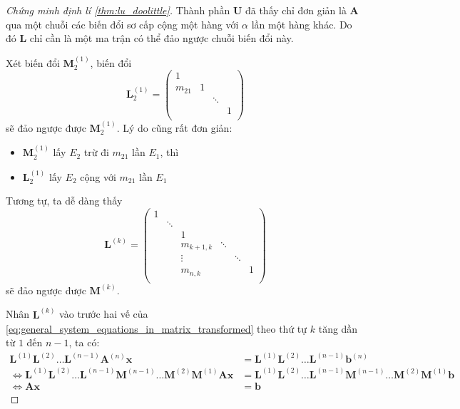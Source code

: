 \documentclass[../../Lectures]{subfiles}
\begin{document}
\begin{proof}[Chứng minh định lí \ref{thm:lu_doolittle}]
    Thành phần \(\bm{U}\) đã thấy chỉ đơn giản là \(\bm{A}\) qua một chuỗi các
    biến đổi sơ cấp cộng một hàng với \(\alpha\) lần một hàng khác. Do đó
    \(\bm{L}\) chỉ cần là một ma trận có thể đảo ngược chuỗi biến đổi này.

    Xét biến đổi \(\bm{M}_2^{(1)}\), biến đổi
    \[
        \bm{L}_2^{(1)} =
            \begin{pmatrix}
                    1   &     &          &     \\
                m_{21}  &  1  &          &     \\
                        &     &  \ddots  &     \\
                        &     &          &  1  \\
            \end{pmatrix}
    \]
    sẽ đảo ngược được \(\bm{M}_2^{(1)}\). Lý do cũng rất đơn giản:
    \begin{itemize}
        \item \(\bm{M}_2^{(1)}\) lấy \(E_2\) trừ đi \(m_{21}\) lần \(E_1\), thì
        \item \(\bm{L}_2^{(1)}\) lấy \(E_2\) cộng với \(m_{21}\) lần \(E_1\)
    \end{itemize}

    Tương tự, ta dễ dàng thấy
    \[
        \bm{L}^{(k)} =
            \begin{pmatrix}
                1  &          &                &          &          &     \\
                   &  \ddots  &                &          &          &     \\
                   &          &        1       &          &          &     \\
                   &          &  m_{k + 1, k}  &  \ddots  &          &     \\
                   &          &     \vdots     &          &  \ddots  &     \\
                   &          &  m_{n, k}      &          &          &  1  \\
            \end{pmatrix}
    \]
    sẽ đảo ngược được \(\bm{M}^{(k)}\).

    Nhân \(\bm{L}^{(k)}\) vào trước hai vế của
    \eqref{eq:general_system_equations_in_matrix_transformed} theo thứ tự \(k\)
    tăng dần từ \(1\) đến \(n - 1\), ta có:
    \begin{align*}
                                                   \bm{L}^{(1)} \bm{L}^{(2)} \ldots \bm{L}^{(n - 1)} \bm{A}^{(n)} \bm{x} &= \bm{L}^{(1)} \bm{L}^{(2)} \ldots \bm{L}^{(n - 1)} \bm{b}^{(n)} \\
        \iff \bm{L}^{(1)} \bm{L}^{(2)} \ldots \bm{L}^{(n - 1)} \bm{M}^{(n - 1)} \ldots \bm{M}^{(2)} \bm{M}^{(1)} \bm{Ax} &= \bm{L}^{(1)} \bm{L}^{(2)} \ldots \bm{L}^{(n - 1)} \bm{M}^{(n - 1)} \ldots \bm{M}^{(2)} \bm{M}^{(1)} \bm{b} \\
                                                                                                            \iff \bm{Ax} &= \bm{b}
    \end{align*}


\end{proof}
\end{document}
